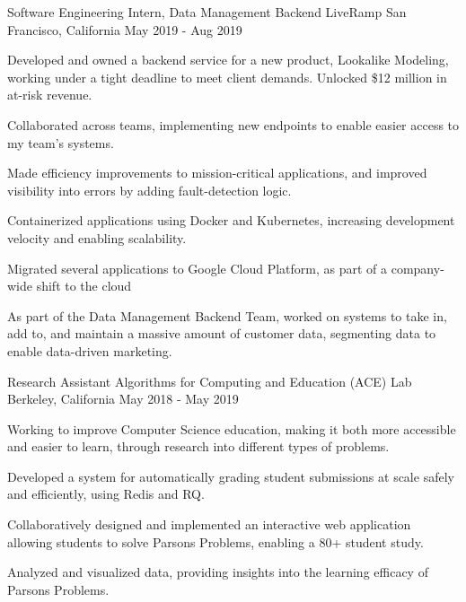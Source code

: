 

\begin{cventries}

    \cventry
      {Software Engineering Intern, Data Management Backend}
      {LiveRamp}
      {San Francisco, California}
      {May 2019 - Aug 2019}
      {
        \begin{cvitems}
          \item Developed and owned a backend service for a new product, Lookalike Modeling, working under a tight deadline to meet client demands. Unlocked \$12 million in at-risk revenue.
          \item Collaborated across teams, implementing new endpoints to enable easier access to my team's systems.
          \item Made efficiency improvements to mission-critical applications, and improved visibility into errors by adding fault-detection logic.
          \item Containerized applications using Docker and Kubernetes, increasing development velocity and enabling scalability.
          \item Migrated several applications to Google Cloud Platform, as part of a company-wide shift to the cloud
          \item As part of the Data Management Backend Team, worked on systems to take in, add to, and maintain a massive amount of customer data, segmenting data to enable data-driven marketing. 
        \end{cvitems}
      }

    \cventry
      {Research Assistant}
      {Algorithms for Computing and Education (ACE) Lab}
      {Berkeley, California}
      {May 2018 - May 2019}
      {
        \begin{cvitems}
          \item Working to improve Computer Science education, making it both more accessible and easier to learn, through research into different types of problems.
          \item Developed a system for automatically grading student submissions at scale safely and efficiently, using Redis and RQ.
          \item Collaboratively designed and implemented an interactive web application allowing students to solve Parsons Problems, enabling a 80+ student study. 
          \item Analyzed and visualized data, providing insights into the learning efficacy of Parsons Problems.
        \end{cvitems}  
      }

\end{cventries}

